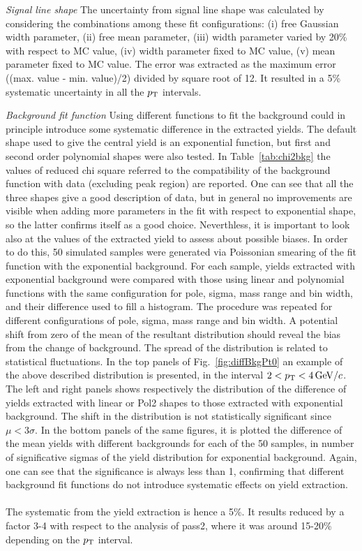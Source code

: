 \emph{Signal line shape}
The uncertainty from signal line shape was calculated by 
considering the combinations among these fit
configurations: (i) free Gaussian width parameter, (ii) free mean parameter, 
(iii) width parameter varied by 20\% with respect to MC value, (iv) width parameter 
fixed to MC value, (v) mean parameter fixed to MC value.
The error was extracted as the maximum error ((max. value - min. value)/2) divided by square root of 12.
It resulted in a 5\% systematic uncertainty in all the $p_{\rm T}$ intervals.

\emph{Background fit function}
Using different functions to fit the background could in 
principle introduce some systematic difference in the extracted yields.
The default shape used to give the central yield is an 
exponential function, but first and second 
order polynomial shapes were also tested. In Table~\ref{tab:chi2bkg} 
the values of reduced chi square referred to the compatibility 
of the background function with data (excluding peak region) are 
reported. One can see that all the three shapes 
give a good description of data, but in general no improvements 
are visible when adding more parameters in the fit
with respect to exponential shape, so the latter confirms itself as a good choice.
Neverthless, it is important to look also at the values of the 
extracted yield to assess about possible biases.
 In order to do this, 50 simulated samples were generated via 
 Poissonian smearing of the fit function with the exponential background.
 For each sample, yields extracted with exponential 
 background were compared with those using linear and 
 polynomial functions with the same
configuration for pole, sigma, mass range and bin width, and their
difference used to fill a histogram. The procedure was repeated for different
configurations of pole, sigma, mass range and bin width. 
A potential shift from zero of the mean of the resultant distribution 
 should reveal the bias from the change of background. The
  spread of the distribution is related to statistical fluctuations. 
  In the top panels of Fig.~\ref{fig:diffBkgPt0} an example of the above 
  described distribution is presented, in the interval $2 < p_{\rm T} < 4\, \mathrm{GeV}/c$.
  The left and right panels shows respectively the distribution of the difference
  of yields extracted with linear or Pol2 shapes to those extracted with exponential
  background. The shift in the distribution is not statistically significant 
 since $\mu < 3\sigma$.
 In the bottom panels of the same figures, it is plotted the 
 difference of the mean yields with different
backgrounds for each of the 50 samples, in number of significative 
sigmas of the yield distribution for exponential background.
 Again, one can see that the significance is always less than 1, 
 confirming that different
background fit functions do not introduce systematic 
effects on yield extraction.\\
 \\
The systematic from the yield extraction is hence a 5\%. 
It results reduced by a factor 3-4 with respect to the analysis of pass2,
where it was around 15-20\% depending on the $p_{\rm T}$ interval. 

